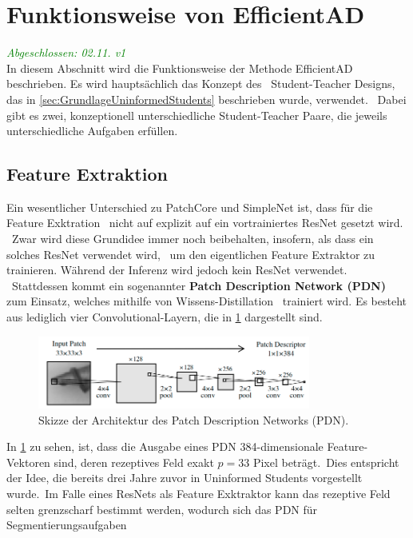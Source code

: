 \section{Funktionsweise von EfficientAD}\label{sec:funktionsweisevonEfficientAD}
\textcolor{green}{\textit{Abgeschlossen: 02.11. v1}}\\
In diesem Abschnitt wird die Funktionsweise der Methode EfficientAD beschrieben. Es wird hauptsächlich das Konzept des \
Student-Teacher Designs, das in \ref{sec:GrundlageUninformedStudents} beschrieben wurde, verwendet. \
Dabei gibt es zwei, konzeptionell unterschiedliche Student-Teacher Paare, die jeweils unterschiedliche Aufgaben erfüllen. \
\subsection{Feature Extraktion}\label{subsubsec:featureextraktionEfficientad}
Ein wesentlicher Unterschied zu PatchCore und SimpleNet ist, dass für die Feature Exktration \
nicht auf explizit auf ein vortrainiertes ResNet gesetzt wird. \ 
Zwar wird diese Grundidee immer noch beibehalten, insofern, als dass ein solches ResNet verwendet wird, \
um den eigentlichen Feature Extraktor zu trainieren. Während der Inferenz wird jedoch kein ResNet verwendet. \
Stattdessen kommt ein sogenannter \textbf{Patch Description Network (PDN)} zum Einsatz, welches mithilfe von Wissens-Distillation \ 
trainiert wird. Es besteht aus lediglich vier Convolutional-Layern, die in \ref{fig:pdn} dargestellt sind.\\
\begin{figure}[h]
    \centering
    \includegraphics[width=0.8\textwidth]{bilder/pdn.png}
    \caption{Skizze der Architektur des Patch Description Networks (PDN). \cite{efficientad}}
    \label{fig:pdn}
\end{figure}
In \ref{fig:pdn} zu sehen, ist, dass die Ausgabe eines PDN 384-dimensionale Feature-Vektoren sind, deren rezeptives Feld exakt $p=33$ Pixel beträgt.\
Dies entspricht der Idee, die bereits drei Jahre zuvor in \glqq Uninformed Students\grqq{} \cite{uninformedstudents} vorgestellt wurde.\
Im Falle eines ResNets als Feature Exktraktor kann das rezeptive Feld selten grenzscharf bestimmt werden, wodurch sich das PDN für Segmentierungsaufgaben\
